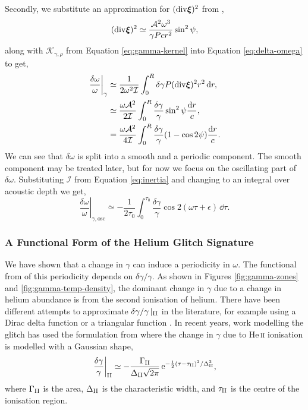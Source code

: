 Secondly, we substitute an approximation for \((\mathrm{div} \bm{\xi})^2\) from \citet{Gough1993},
%
\begin{equation}
    (\mathrm{div} \bm{\xi})^2 \simeq \frac{{\mathcal{A}}^2 \omega^3}{\gamma P c r^2} \sin^2\psi, \label{eq:div-xi}
\end{equation}
%
along with \(\mathcal{K}_{\gamma,\rho}\) from Equation \ref{eq:gamma-kernel} into Equation \ref{eq:delta-omega} to get,
%
\begin{align}
    \left.\frac{\delta\omega}{\omega}\right|_\gamma &\simeq \frac{1}{2\omega^2\mathcal{I}} \int_0^{R} \delta\gamma P (\mathrm{div} \bm{\xi})^2 r^2 \, \mathrm{d} r, \notag \\
    &\simeq \frac{\omega {\mathcal{A}}^2}{2 \mathcal{I}} \int_0^{R} \frac{\delta\gamma}{\gamma}\sin^2\psi\frac{\mathrm{d} r}{c}, \notag \\
    &= \frac{\omega {\mathcal{A}}^2}{4 \mathcal{I}} \int_0^{R} \frac{\delta\gamma}{\gamma}(1 - \cos 2\psi)\frac{\mathrm{d} r}{c}.
\end{align}
%
We can see that \(\delta\omega\) is split into a smooth and a periodic component. The smooth component may be treated later, but for now we focus on the oscillating part of \(\delta\omega\). Substituting \(\mathcal{I}\) from Equation \ref{eq:inertia} and changing to an integral over acoustic depth we get,
%
\begin{equation}
    \left.\frac{\delta\omega}{\omega}\right|_{\gamma,\mathrm{osc}} \simeq - \frac{1}{2\tau_0} \int_0^{\tau_0} \frac{\delta\gamma}{\gamma} \cos 2 (\omega\tau + \epsilon) \, \dd \tau. \label{eq:omega-osc}
\end{equation}
%

\subsubsection{A Functional Form of the Helium Glitch Signature}

We have shown that a change in \(\gamma\) can induce a periodicity in \(\omega\). The functional from of this periodicity depends on \(\delta\gamma/\gamma\). As shown in Figures \ref{fig:gamma-zones} and \ref{fig:gamma-temp-density}, the dominant change in \(\gamma\) due to a change in helium abundance is from the second ionisation of helium. There have been different attempts to approximate \(\delta\gamma/\gamma\,|_{{\mathrm{II}}}\) in the literature, for example using a Dirac delta function or a triangular function \citep{Monteiro.Christensen-Dalsgaard.ea1994,Monteiro.Thompson2005}. In recent years, work modelling the glitch has used the formulation from \citet{Houdek.Gough2007} where the change in \(\gamma\) due to He\,\textsc{ii} ionisation is modelled with a Gaussian shape,
%
\begin{equation}
    \left.\frac{\delta\gamma}{\gamma}\right|_{{\mathrm{II}}} \simeq - \frac{\Gamma_{{\mathrm{II}}}}{\Delta_{{\mathrm{II}}} \sqrt{2\pi}} \, \mathrm{e}^{- \frac12{(\tau - \tau_{{\mathrm{II}}})^2}/{\Delta_{{\mathrm{II}}}^2} }, \label{eq:he-gamma}
\end{equation}
%
where \(\Gamma_{{\mathrm{II}}}\) is the area, \(\Delta_{{\mathrm{II}}}\) is the characteristic width, and \(\tau_{{\mathrm{II}}}\) is the centre of the ionisation region.

